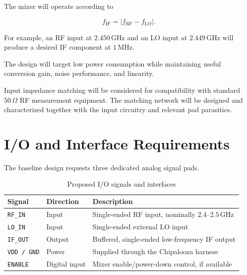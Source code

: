 \documentclass[11pt,letterpaper]{article}
\begin{document}
The mixer will operate according to

\begin{equation}
    f_{\mathrm{IF}}
    =
    \left|f_{\mathrm{RF}}-f_{\mathrm{LO}}\right|.
\end{equation}

For example, an RF input at \(2.450\,\mathrm{GHz}\) and an
LO input at \(2.449\,\mathrm{GHz}\) will produce a desired
IF component at \(1\,\mathrm{MHz}\).


The design will target low power consumption while
maintaining useful conversion gain, noise performance,
and linearity.

Input impedance matching will be considered for
compatibility with standard \(50\,\Omega\) RF measurement
equipment. The matching network will be designed and
characterized together with the input circuitry and
relevant pad parasitics.


\section{I/O and Interface Requirements}

The baseline design requests three dedicated analog
signal pads.

\begin{table}[htbp]
\centering
\caption{Proposed I/O signals and interfaces}
\label{tab:io}
\begin{tabularx}{\textwidth}{@{}llY@{}}
\toprule
\textbf{Signal} &
\textbf{Direction} &
\textbf{Description} \\
\midrule

\texttt{RF\_IN} &
Input &
Single-ended RF input, nominally
\(2.4\)--\(2.5\,\mathrm{GHz}\) \\

\texttt{LO\_IN} &
Input &
Single-ended external LO input \\

\texttt{IF\_OUT} &
Output &
Buffered, single-ended low-frequency IF output \\

\texttt{VDD / GND} &
Power &
Supplied through the Chipalooza harness \\

\texttt{ENABLE} &
Digital input &
Mixer enable/power-down control, if available \\

\bottomrule
\end{tabularx}
\end{table}
\end{document}
